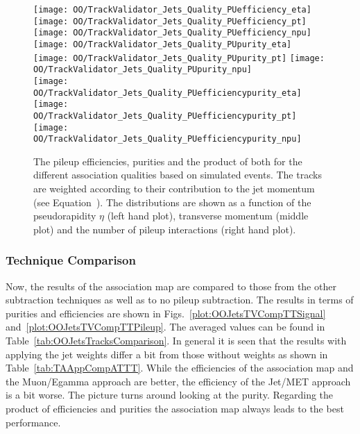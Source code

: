\begin{figure}[Ht]
  \centering
  \texttt{[image: OO/TrackValidator\_Jets\_Quality\_PUefficiency\_eta]}
  \texttt{[image: OO/TrackValidator\_Jets\_Quality\_PUefficiency\_pt]}
  \texttt{[image: OO/TrackValidator\_Jets\_Quality\_PUefficiency\_npu]}
  \\
  \texttt{[image: OO/TrackValidator\_Jets\_Quality\_PUpurity\_eta]}
  \texttt{[image: OO/TrackValidator\_Jets\_Quality\_PUpurity\_pt]}
  \texttt{[image: OO/TrackValidator\_Jets\_Quality\_PUpurity\_npu]}
  \\
  \texttt{[image: OO/TrackValidator\_Jets\_Quality\_PUefficiencypurity\_eta]}
  \texttt{[image: OO/TrackValidator\_Jets\_Quality\_PUefficiencypurity\_pt]}
  \texttt{[image: OO/TrackValidator\_Jets\_Quality\_PUefficiencypurity\_npu]}
  \caption[Pileup efficiencies, purities and their product of the different association qualities based on simulated \ttbar events with jet weight]{The pileup efficiencies, purities and the product of both for the different association qualities based on simulated \ttbar events. The tracks are weighted according to their contribution to the jet momentum (see Equation~). The distributions are shown as a function of the pseudorapidity $\eta$ (left hand plot), transverse momentum (middle plot) and the number of pileup interactions (right hand plot). \label{plot:OOJetsTVQualTTPileup}}
\end{figure}



\subsubsection{Technique Comparison \label{sec:OOJetsTracksComparison} }

Now, the results of the association map are compared to those from the other subtraction techniques as well as to no pileup subtraction. The results in terms of purities and efficiencies are shown in Figs.~\ref{plot:OOJetsTVCompTTSignal} and~\ref{plot:OOJetsTVCompTTPileup}. The averaged values can be found in Table~\ref{tab:OOJetsTracksComparison}. In general it is seen that the results with applying the jet weights differ a bit from those without weights as shown in Table~\ref{tab:TAAppCompATTT}. While the efficiencies of the association map and the Muon/Egamma approach are better, the efficiency of the Jet/MET approach is a bit worse. The picture turns around looking at the purity. Regarding the product of efficiencies and purities the association map always leads to the best performance.

